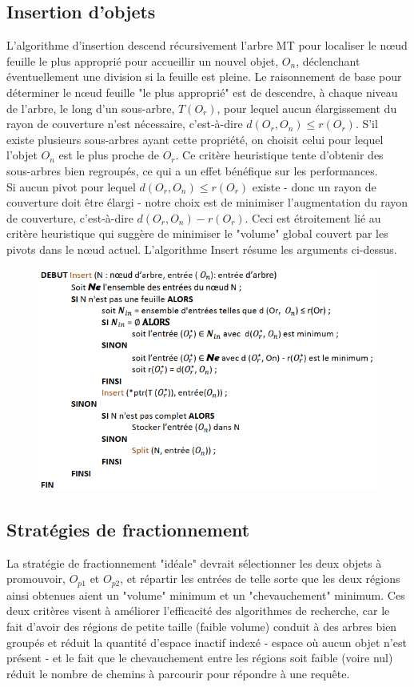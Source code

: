 \subsection{Insertion d'objets}
L'algorithme d'insertion descend récursivement l'arbre MT pour localiser le nœud feuille le plus approprié pour accueillir un nouvel objet, $ O_n $, déclenchant éventuellement une division si la feuille est pleine. Le raisonnement de base pour déterminer le nœud feuille "le plus approprié" est de descendre, à chaque niveau de l'arbre, le long d'un sous-arbre, $ T(O_r) $, pour lequel aucun élargissement du rayon de couverture n'est nécessaire, c'est-à-dire $  d(O_r, O_n) \le r(O_r) $. S'il existe plusieurs sous-arbres ayant cette propriété, on choisit celui pour lequel l'objet $ O_n $ est le plus proche de $ O_r $. Ce critère heuristique tente d'obtenir des sous-arbres bien regroupés, ce qui a un effet bénéfique sur les performances.\\

Si aucun pivot pour lequel $ d(O_r, O_n) \le r(O_r) $ existe - donc un rayon de couverture doit être élargi - notre choix est de minimiser l'augmentation du rayon de couverture, c'est-à-dire $ d(O_r, O_n)-r(O_r) $. Ceci est étroitement lié au critère heuristique qui suggère de minimiser le "volume" global couvert par les pivots dans le nœud actuel. L'algorithme Insert résume les arguments ci-dessus.
\begin{figure}[H]
	\centering
	\includegraphics[width=.9 \textwidth]{Figures/insert.png} %
\end{figure} 


\subsection{Stratégies de fractionnement}
La stratégie de fractionnement "idéale" devrait sélectionner les deux objets à promouvoir, $ O_{p1} $ et $ O_{p2} $, et répartir les entrées de telle sorte que les deux régions ainsi obtenues aient un "volume" minimum et un "chevauchement" minimum. Ces deux critères visent à améliorer l'efficacité des algorithmes de recherche, car le fait d'avoir des régions de petite taille (faible volume) conduit à des arbres bien groupés et réduit la quantité d'espace inactif indexé - espace où aucun objet n'est présent - et le fait que le chevauchement entre les régions soit faible (voire nul) réduit le nombre de chemins à parcourir pour répondre à une requête.\\

